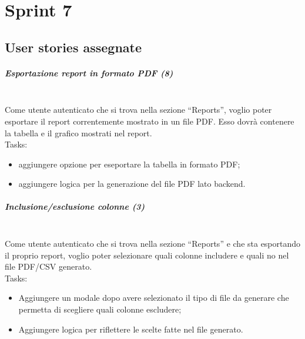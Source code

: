 
\chapter{Sprint 7}
\label{cap:sprint7}

\section{User stories assegnate}

\paragraph{Esportazione report in formato PDF (8)}\mbox{} \\[\baselineskip]
Come utente autenticato che si trova nella sezione “Reports”, voglio poter esportare il report correntemente mostrato in un file PDF.
Esso dovrà contenere la tabella e il grafico mostrati nel report.\\

\noindent Tasks:
\begin{itemize}
  \item aggiungere opzione per eseportare la tabella in formato PDF;
  \item aggiungere logica per la generazione del file PDF lato backend.
\end{itemize}

\paragraph{Inclusione/esclusione colonne (3)}\mbox{} \\[\baselineskip]
Come utente autenticato che si trova nella sezione “Reports” e che sta esportando il proprio report, voglio poter selezionare quali colonne includere e quali no nel file PDF/CSV generato.\\

\noindent Tasks:
\begin{itemize}
  \item Aggiungere un modale dopo avere selezionato il tipo di file da generare che permetta di scegliere quali colonne escludere;
  \item Aggiungere logica per riflettere le scelte fatte nel file generato.
\end{itemize}

